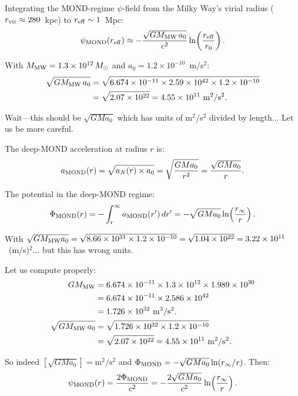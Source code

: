 \documentclass[aps,prl,twocolumn,superscriptaddress,showpacs]{revtex4-2}
\newcommand{\azero}{a_0}
\newcommand{\Msun}{M_\odot}
\begin{document}
Integrating the MOND-regime $\psi$-field from the Milky Way's
virial radius ($r_{\rm vir} \approx 280$~kpc) to
$r_{\rm eff} \sim 1$~Mpc:
\begin{equation}
\psi_{\rm MOND}(r_{\rm eff}) \approx
-\frac{\sqrt{GM_{\rm MW}\,\azero}}{c^2}\ln\!\left(\frac{r_{\rm eff}}{r_0}\right).
\end{equation}

With $M_{\rm MW} = 1.3\times 10^{12}\,\Msun$ and
$\azero = 1.2\times 10^{-10}$~m/s$^2$:
\begin{align}
\sqrt{GM_{\rm MW}\,\azero} &= \sqrt{6.674\times 10^{-11}\times 2.59\times 10^{42}\times 1.2\times 10^{-10}} \nonumber\\
&= \sqrt{2.07\times 10^{22}} = 4.55\times 10^{11}~\text{m}^2/\text{s}^2.
\end{align}

Wait---this should be $\sqrt{GM\azero}$ which has units of
m$^2$/s$^2$ divided by length... Let us be more careful.

The deep-MOND acceleration at radius $r$ is:
\begin{equation}
a_{\rm MOND}(r) = \sqrt{a_N(r)\times\azero}
= \sqrt{\frac{GM\azero}{r^2}} = \frac{\sqrt{GM\azero}}{r}.
\end{equation}

The potential in the deep-MOND regime:
\begin{equation}
\Phi_{\rm MOND}(r) = -\int_r^\infty a_{\rm MOND}(r')\,dr'
= -\sqrt{GM\azero}\ln\!\left(\frac{r_\infty}{r}\right).
\end{equation}

With $\sqrt{GM_{\rm MW}\azero} = \sqrt{8.66\times 10^{31}\times 1.2\times 10^{-10}} = \sqrt{1.04\times 10^{22}} = 3.22\times 10^{11}$~(m/s)$^2$... but this has wrong units.

Let us compute properly:
\begin{align}
GM_{\rm MW} &= 6.674\times 10^{-11}\times 1.3\times 10^{12}\times 1.989\times 10^{30} \nonumber\\
&= 6.674\times 10^{-11}\times 2.586\times 10^{42} \nonumber\\
&= 1.726\times 10^{32}~\text{m}^3/\text{s}^2. \\
\sqrt{GM_{\rm MW}\,\azero} &= \sqrt{1.726\times 10^{32}\times 1.2\times 10^{-10}} \nonumber\\
&= \sqrt{2.07\times 10^{22}} = 4.55\times 10^{11}~\text{m}^2/\text{s}^2.
\end{align}

So indeed $[\sqrt{GM\azero}] = \text{m}^2/\text{s}^2$ and
$\Phi_{\rm MOND} = -\sqrt{GM\azero}\ln(r_\infty/r)$.  Then:
\begin{equation}
\psi_{\rm MOND}(r) = \frac{2\Phi_{\rm MOND}}{c^2}
= -\frac{2\sqrt{GM\azero}}{c^2}\ln\!\left(\frac{r_\infty}{r}\right).
\end{equation}
\end{document}
